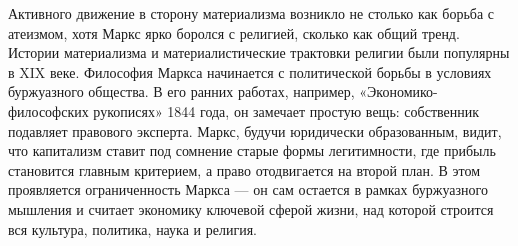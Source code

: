 Активного движение в сторону материализма возникло не столько как борьба с атеизмом, хотя Маркс ярко боролся с религией, сколько как общий тренд. Истории материализма и материалистические трактовки религии были популярны в XIX веке.
 Философия Маркса начинается с политической борьбы в условиях буржуазного общества. В его ранних работах, например, «Экономико-философских рукописях» 1844 года, он замечает простую вещь: собственник подавляет правового эксперта. Маркс, будучи юридически образованным, видит, что капитализм ставит под сомнение старые формы легитимности, где прибыль становится главным критерием, а право отодвигается на второй план. В этом проявляется ограниченность Маркса --- он сам остается в рамках буржуазного мышления и считает экономику ключевой сферой жизни, над которой строится вся культура, политика, наука и религия.


